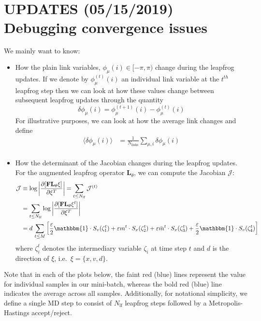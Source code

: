 \documentclass[../main.tex]{subfiles}
\newcommand{\lfop}{\mathbf{L}_{\theta}}
\begin{document}
\section{UPDATES (05/15/2019) Debugging convergence issues}
We mainly want to know:
\begin{itemize}
  \item How the plain link variables, $\phi_{\mu}(i) \in [-\pi, \pi)$ change during the leapfrog updates. If we
    denote by $\phi_{\mu}^{(t)}{(i)}$ an individual link variable at the $t^{th}$ leapfrog step then we can look at how
    these values change between subsequent leapfrog updates through the quantity
    \begin{equation}
      \delta \phi_{\mu}{(i)} = \phi_{\mu}^{(t+1)}{(i)} - \phi_{\mu}^{(t)}{(i)}
    \end{equation}
    For illustrative purposes, we can look at how the average link changes and define
    \begin{align}
      \langle \delta \phi_{\mu}{(i)}\rangle &= \frac{1}{N_{\mathrm{links}}}\sum_{\mu, i} \delta \phi_{\mu}(i) \\
    \end{align}
  \item How the determinant of the Jacobian changes during the leapfrog updates. For the augmented leapfrog operator
    $\lfop$, we can compute the Jacobian $\mathcal{J}$:
    \begin{align}
      \mathcal{J} &\equiv \log\left|\frac{\partial {[\mathbf{F}\lfop\xi]}}{\partial\xi^{T}}\right| = \sum_{t \leq
                      N_{\mathrm{lf}}} \mathcal{J}^{(t)} \\
                  &= \sum_{t\leq N_{\mathrm{lf}}} \log\left|\frac{\partial 
                      {[\mathbf{F}\lfop\xi^{t}]}}{\partial\xi^{T}}\right| \\
                  &= d \, \sum_{t \leq M} \bigg[\frac{\eps}{2}\mathbbm{1}\cdot S_{v}{(\zeta_1^t)}
                      + \varepsilon m^t \cdot S_x{(\zeta_2^t)} + \varepsilon \bar{m}^t \cdot S_x{(\zeta_3^t)}
                      + \frac{\varepsilon}{2}\mathbbm{1}\cdot S_{v}{(\zeta_4^t)}\bigg]
    \label{eq:logdet}
    \end{align}
    where $\zeta_i^t$ denotes the intermediary variable $\zeta_i$ at time step $t$ and $d$ is the direction of $\xi$,
    i.e.\ $\xi = \{x, v, d\}$.
\end{itemize}

Note that in each of the plots below, the faint red (blue) lines represent the value for individual samples in our
mini-batch, whereas the bold red (blue) line indicates the average across all samples.
%
Additionally, for notational simplicity, we define a single MD step to consist of $N_{\mathrm{lf}}$ leapfrog steps
followed by a Metropolis-Hastings accept/reject.

% 
\end{document}
